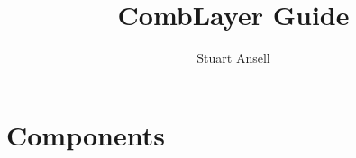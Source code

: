 \documentclass{article}
\title{CombLayer Guide}
\author{Stuart Ansell}
\begin{document}
\maketitle
\tableofcontents


\newpage







\section{Components}



\end{document}
